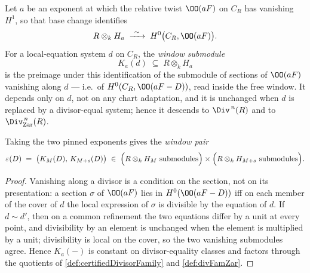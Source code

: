 \begin{definition}
  \label{def:divisorWindow}
  \leanok
  Let \(a\) be an exponent at which the relative twist \(\OO(aF)\) on \(C_R\) has vanishing
  \(H^1\), so that base change identifies
  \[
    R \otimes_k H_a \;\xrightarrow{\ \sim\ }\; H^0\bigl(C_R, \OO(aF)\bigr).
  \]
  For a local-equation system \(d\) on \(C_R\), the \emph{window submodule}
  \[
    K_a(d) \;\subseteq\; R \otimes_k H_a
  \]
  is the preimage under this identification of the submodule of sections of \(\OO(aF)\)
  vanishing along \(d\) --- i.e.\ of \(H^0(C_R, \OO(aF - D))\), read inside the free
  window. It depends only on \(d\), not on any chart adaptation, and it is unchanged when
  \(d\) is replaced by a divisor-equal system; hence it descends to \(\Div^{\,n}(R)\) and to
  \(\Div^{\,n}_{\mathrm{Zar}}(R)\).

  Taking the two pinned exponents gives the \emph{window pair}
  \[
    \varepsilon(D) \;=\; \bigl(K_M(D),\, K_{M+s}(D)\bigr)
      \;\in\; \Bigl(R \otimes_k H_M \ \text{submodules}\Bigr)
        \times \Bigl(R \otimes_k H_{M+s}\ \text{submodules}\Bigr).
  \]
\end{definition}
\begin{proof}
  \leanok
  Vanishing along a divisor is a condition on the section, not on its presentation:
  a section \(\sigma\) of \(\OO(aF)\) lies in \(H^0(\OO(aF-D))\) iff on each member of the
  cover of \(d\) the local expression of \(\sigma\) is divisible by the equation of \(d\).
  If \(d \sim d'\), then on a common refinement the two equations differ by a unit at every
  point, and divisibility by an element is unchanged when the element is multiplied by a
  unit; divisibility is local on the cover, so the two vanishing submodules agree. Hence
  \(K_a(-)\) is constant on divisor-equality classes and factors through the quotients of
  \ref{def:certifiedDivisorFamily} and \ref{def:divFamZar}.
\end{proof}

